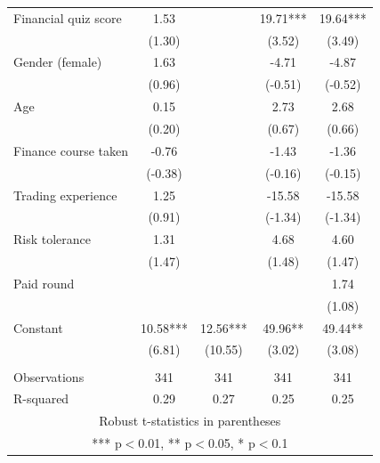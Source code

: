 \documentclass[]{article}
\begin{document}
\begin{tabular}{lcccc}
Financial quiz score & 1.53 &  & 19.71*** & 19.64*** \\
 & (1.30) &  & (3.52) & (3.49) \\
Gender (female) & 1.63 &  & -4.71 & -4.87 \\
 & (0.96) &  & (-0.51) & (-0.52) \\
Age & 0.15 &  & 2.73 & 2.68 \\
 & (0.20) &  & (0.67) & (0.66) \\
Finance course taken & -0.76 &  & -1.43 & -1.36 \\
 & (-0.38) &  & (-0.16) & (-0.15) \\
Trading experience & 1.25 &  & -15.58 & -15.58 \\
 & (0.91) &  & (-1.34) & (-1.34) \\
Risk tolerance & 1.31 &  & 4.68 & 4.60 \\
 & (1.47) &  & (1.48) & (1.47) \\
Paid round &  &  &  & 1.74 \\
 &  &  &  & (1.08) \\
Constant & 10.58*** & 12.56*** & 49.96** & 49.44** \\
 & (6.81) & (10.55) & (3.02) & (3.08) \\
 &  &  &  &  \\
Observations & 341 & 341 & 341 & 341 \\
 R-squared & 0.29 & 0.27 & 0.25 & 0.25 \\ \hline
\multicolumn{5}{c}{ Robust t-statistics in parentheses} \\
\multicolumn{5}{c}{ *** p$<$0.01, ** p$<$0.05, * p$<$0.1} \\
\end{tabular}
\end{document}
